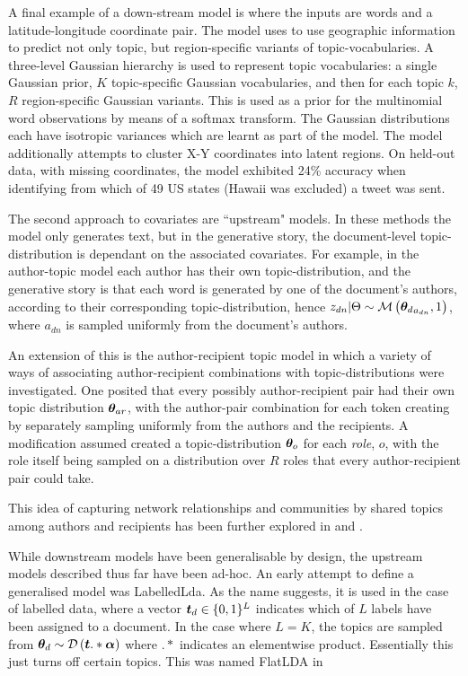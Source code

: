 A final example of a down-stream model is\cite{Eisenstein2010} where the inputs are words and a latitude-longitude coordinate pair. The model uses to use geographic information to predict not only topic, but region-specific variants of topic-vocabularies. A three-level Gaussian hierarchy is used to represent topic vocabularies: a single Gaussian prior, $K$ topic-specific Gaussian vocabularies, and then for each topic $k$, $R$ region-specific Gaussian variants. This is used as a prior for the multinomial word observations by means of a softmax transform. The Gaussian distributions each have isotropic variances which are learnt as part of the model. The model additionally attempts to cluster X-Y coordinates into latent regions. On held-out data, with missing coordinates, the model exhibited 24\% accuracy when identifying from which of 49 US states (Hawaii was excluded) a tweet was sent.

The second approach to covariates are ``upstream" models. In these methods the model only generates text, but in the generative story, the document-level topic-distribution is dependant on the associated covariates. For example, in the author-topic model\cite{RosenZvi2004} each author has their own topic-distribution, and the generative story is that each word is generated by one of the document's authors, according to their corresponding topic-distribution, hence $z_{dn} | \Theta \sim \mathcal{M} \left( {{ \bm \theta_d }_{a_{dn}}},{1} \right)$, where $a_{dn}$ is sampled uniformly from the document's authors.

An extension of this is the author-recipient topic model\cite{MacCallum2007} in which a variety of ways of associating author-recipient combinations with topic-distributions were investigated. One posited that every possibly author-recipient pair had their own topic distribution $\bm \theta_{ar}$, with the author-pair combination for each token creating by separately sampling uniformly from the authors and the recipients. A modification assumed created a topic-distribution $\bm \theta_o$ for each \emph{role}, $o$, with the role itself being sampled on a distribution over $R$ roles that every author-recipient pair could take. 

This idea of capturing network relationships and communities by shared topics among authors and recipients has been further explored in \cite{Sachan2012} and \cite{Kang2013}.

While downstream models have been generalisable by design, the upstream models described thus far have been ad-hoc. An early attempt to define a generalised model was LabelledLda\cite{Ramage2009}. As the name suggests, it is used in the case of labelled data, where a vector $\bm t_d \in \{0,1\}^L$ indicates which of $L$ labels have been assigned to a document. In the case where $L = K$, the topics are sampled from ${ \bm \theta_d } \sim \mathcal{D} \left( {\bm t .* \bm \alpha} \right)$ where $.*$ indicates an elementwise product. Essentially this just turns off certain topics. This was named FlatLDA in\cite{Rubin2011}

